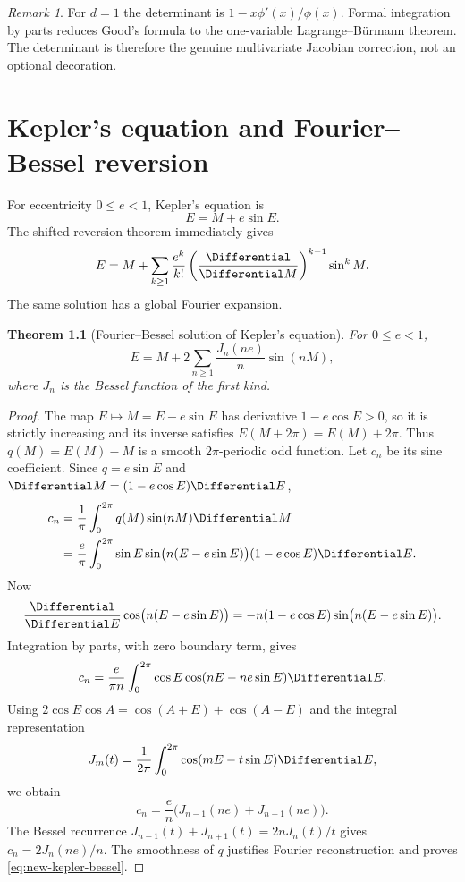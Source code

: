 \documentclass[11pt,a4paper,oneside,openany]{book}
\newtheorem{theorem}{Theorem}[chapter]
\theoremstyle{definition}
\theoremstyle{remark}
\newtheorem{remark}[theorem]{Remark}
\begin{document}
\begin{remark}
For $d=1$ the determinant is $1-x\phi'(x)/\phi(x)$.  Formal integration by
parts reduces Good's formula to the one-variable Lagrange--Bürmann theorem.
The determinant is therefore the genuine multivariate Jacobian correction,
not an optional decoration.
\end{remark}

\chapter{Kepler's equation and Fourier--Bessel reversion}
\label{ch:kepler}

For eccentricity $0\le e<1$, Kepler's equation is
\begin{equation}\label{eq:new-kepler}
 E=M+e\sin E.
\end{equation}
The shifted reversion theorem immediately gives
\begin{equation}\label{eq:new-kepler-reversion}
 E=M+\sum_{k\ge1}\frac{e^k}{k!}
 \left(\frac{\Differential}{\Differential M}\right)^{k-1}\sin^kM.
\end{equation}
The same solution has a global Fourier expansion.

\begin{theorem}[Fourier--Bessel solution of Kepler's equation]
\label{thm:new-kepler-bessel}
For $0\le e<1$,
\begin{equation}\label{eq:new-kepler-bessel}
 \boxed{\displaystyle
 E=M+2\sum_{n\ge1}\frac{J_n(ne)}n\sin(nM),}
\end{equation}
where $J_n$ is the Bessel function of the first kind.
\end{theorem}

\begin{proof}
The map $E\mapsto M=E-e\sin E$ has derivative $1-e\cos E>0$, so it is
strictly increasing and its inverse satisfies $E(M+2\pi)=E(M)+2\pi$.
Thus $q(M)=E(M)-M$ is a smooth $2\pi$-periodic odd function.  Let $c_n$ be
its sine coefficient.  Since $q=e\sin E$ and
$\Differential M=(1-e\cos E)\Differential E$,
\begin{align*}
 c_n
 &=\frac1\pi\int_0^{2\pi}q(M)\sin(nM)\Differential M\\
 &=\frac e\pi\int_0^{2\pi}\sin E
 \sin\bigl(n(E-e\sin E)\bigr)(1-e\cos E)\Differential E.
\end{align*}
Now
\[
 \frac{\Differential}{\Differential E}\cos\bigl(n(E-e\sin E)\bigr)
 =-n(1-e\cos E)\sin\bigl(n(E-e\sin E)\bigr).
\]
Integration by parts, with zero boundary term, gives
\[
 c_n=\frac e{\pi n}\int_0^{2\pi}
 \cos E\cos(nE-ne\sin E)\Differential E.
\]
Using $2\cos E\cos A=\cos(A+E)+\cos(A-E)$ and the integral representation
\[
 J_m(t)=\frac1{2\pi}\int_0^{2\pi}\cos(mE-t\sin E)\Differential E,
\]
we obtain
\[
 c_n=\frac e n\bigl(J_{n-1}(ne)+J_{n+1}(ne)\bigr).
\]
The Bessel recurrence
$J_{n-1}(t)+J_{n+1}(t)=2nJ_n(t)/t$ gives $c_n=2J_n(ne)/n$.
The smoothness of $q$ justifies Fourier reconstruction and proves
\eqref{eq:new-kepler-bessel}.
\end{proof}
\end{document}

